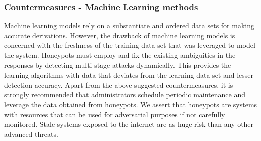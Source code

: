 \documentclass[../main.tex]{subfiles}
\begin{document}
\subsubsection{Countermeasures - Machine Learning methods}
Machine learning models rely on a substantiate and ordered data sets for making accurate derivations. However, the drawback of machine learning models is concerned with the freshness of the training data set that was leveraged to model the system. Honeypots must employ and fix the existing ambiguities in the responses by detecting multi-stage attacks dynamically. This provides the learning algorithms with data that deviates from the learning data set and lesser detection accuracy.
\newline
Apart from the above-suggested countermeasures, it is strongly recommended that administrators schedule periodic maintenance and leverage the data obtained from honeypots. We assert that honeypots are systems with resources that can be used for adversarial purposes if not carefully monitored. Stale systems exposed to the internet are as huge risk than any other advanced threats. 
\end{document}
